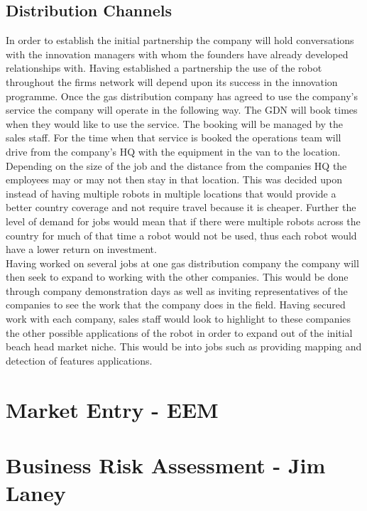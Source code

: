 \documentclass[11pt]{article}		%
\begin{document}
        \subsection{Distribution Channels}
	        
	       In order to establish the initial partnership the company will hold conversations with the innovation managers with whom the founders have already developed relationships with. Having established a partnership the use of the robot throughout the firms network will depend upon its success in the innovation programme. Once the gas distribution company has agreed to use the company’s service the  company will operate in the following way. The GDN will book times when they would like to use the service. The booking will be managed by the sales staff. For the time when that service is booked the operations team will drive from the company’s HQ with the equipment in the van to the location. Depending on the size of the job and the distance from the companies HQ the employees may or may not then stay in that location. This was decided upon instead of having multiple robots in multiple locations that would provide a better country coverage and not require travel because it is cheaper. Further the level of demand for jobs would mean that if there were multiple robots across the country for much of that time a robot would not be used, thus each robot would have a lower return on investment.
	       \\
            Having worked on several jobs at one gas distribution company the company will then seek to expand to working with the other companies. This would be done through company demonstration days as well as inviting representatives of the companies to see the work that the company does in the field. Having secured work with each company, sales staff would look to highlight to these companies the other possible applications of the robot in order to expand out of the initial beach head market niche. This would be into jobs such as providing mapping and detection of features applications.
            
	\section{Market Entry - EEM}
	
	\section[Business Risk Assessment - EEM]{Business Risk Assessment - Jim Laney}
     	
\end{document}
